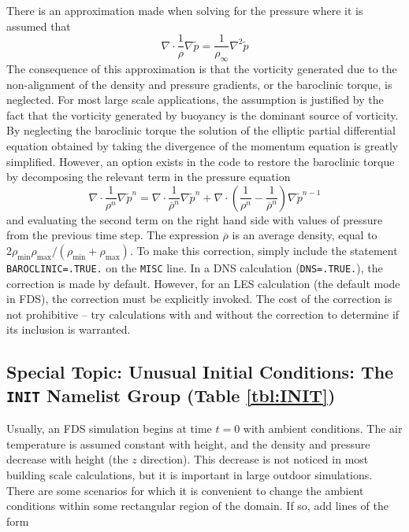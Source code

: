 \documentclass[11pt]{book}
\newcommand{\ct}{\tt\small}
\newcommand{\tp}{\tilde{p}}
\newcommand{\be}{\begin{equation}}
\newcommand{\ee}{\end{equation}}
\begin{document}
There is an approximation made when solving for the pressure where it is assumed that
\be \nabla \cdot \frac{1}{\rho} \nabla \tp = \frac{1}{\rho_\infty} \nabla^2 \tp \label{Happrox} \ee
The consequence of this approximation is that the vorticity generated
due to the non-alignment of the density and pressure gradients, or the
baroclinic torque, is neglected. For most large scale applications,
the assumption is justified by the fact that the vorticity generated by
buoyancy is the dominant source of vorticity.
By neglecting the baroclinic torque the
solution of the elliptic partial differential equation obtained by
taking the divergence of the momentum equation is greatly simplified.
However, an option exists in the code to restore the baroclinic torque by
decomposing the relevant term in the pressure equation
\be \nabla \cdot \frac{1}{\rho^n} \nabla \tp^n = \nabla \cdot \frac{1}{\overline{\rho}^n} \nabla \tp^n +
   \nabla \cdot \left( \frac{1}{\rho^n} - \frac{1}{\overline{\rho}^n} \right) \nabla \tp^{n-1}   \ee
and evaluating the second term on the right hand side with values of
pressure from the
previous time step. The expression $\overline{\rho}$ is an average density,
equal to $2 \rho_{\min} \rho_{\max} / (\rho_{\min} + \rho_{\max})$.
To make this correction, simply include the statement {\ct BAROCLINIC=.TRUE.}
on the {\ct MISC} line. In a DNS calculation ({\ct DNS=.TRUE.}), the
correction is made by default. However, for an LES calculation (the default mode in FDS),
the correction must be explicitly invoked. The cost of the
correction is not prohibitive -- try calculations with and without
the correction to determine if its inclusion is warranted.


\subsection{Special Topic: Unusual Initial Conditions: The \texorpdfstring{{\tt INIT}}{INIT} Namelist Group (Table \ref{tbl:INIT})}
\label{info:INIT}

Usually, an FDS simulation begins at time $t=0$ with ambient conditions. The air temperature is
assumed constant with height, and the density and pressure decrease with height (the $z$ direction). This
decrease is not noticed in most building scale calculations, but it is important in large outdoor
simulations. There are some scenarios for which it is convenient to change the ambient conditions within some
rectangular region of the domain. If so, add lines of the form
\end{document}
